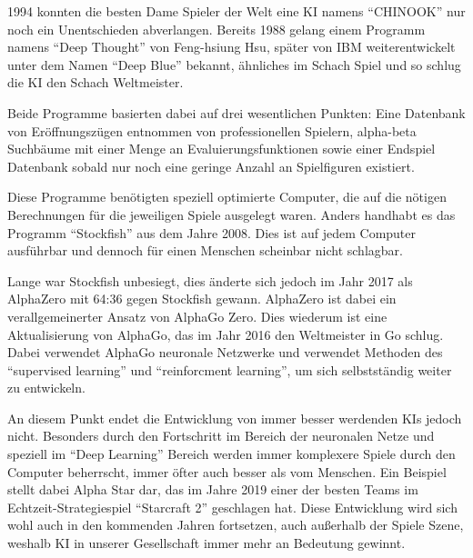 1994 konnten die besten Dame Spieler der Welt eine KI namens ``CHINOOK'' nur noch ein Unentschieden abverlangen. \cite{Schaeffer1996} Bereits 1988 gelang einem Programm namens ``Deep Thought'' von Feng-hsiung Hsu, später von IBM weiterentwickelt unter dem Namen ``Deep Blue'' bekannt, ähnliches im Schach Spiel und so schlug die KI den Schach Weltmeister. \cite{Kurenkov2019}

Beide Programme basierten dabei auf drei wesentlichen Punkten: Eine Datenbank von Eröffnungszügen entnommen von professionellen Spielern, alpha-beta Suchbäume mit einer Menge an Evaluierungsfunktionen sowie einer Endspiel Datenbank sobald nur noch eine geringe Anzahl an Spielfiguren existiert. \cite{Kurenkov2019}


Diese Programme benötigten speziell optimierte Computer, die auf die nötigen Berechnungen für die jeweiligen Spiele ausgelegt waren. Anders handhabt es das Programm ``Stockfish'' aus dem Jahre 2008. Dies ist auf jedem Computer ausführbar und dennoch für einen Menschen scheinbar nicht schlagbar.

Lange war Stockfish unbesiegt, dies änderte sich jedoch im Jahr 2017 als AlphaZero mit 64:36 gegen Stockfish gewann. AlphaZero ist dabei ein verallgemeinerter Ansatz von AlphaGo Zero. Dies wiederum ist eine Aktualisierung von AlphaGo, das im Jahr 2016 den Weltmeister in Go schlug. Dabei verwendet AlphaGo neuronale Netzwerke und verwendet Methoden des ``supervised learning'' und ``reinforcment learning'', um sich selbstständig weiter zu entwickeln. \cite{Fischer}


An diesem Punkt endet die Entwicklung von immer besser werdenden KIs jedoch nicht. Besonders durch den Fortschritt im Bereich der neuronalen Netze und speziell im ``Deep Learning'' Bereich werden immer komplexere Spiele durch den Computer beherrscht, immer öfter auch besser als vom Menschen. Ein Beispiel stellt dabei Alpha Star dar, das im Jahre 2019 einer der besten Teams im Echtzeit-Strategiespiel ``Starcraft 2'' geschlagen hat. Diese Entwicklung wird sich wohl auch in den kommenden Jahren fortsetzen, auch außerhalb der Spiele Szene, weshalb KI in unserer Gesellschaft immer mehr an Bedeutung gewinnt. \cite{OriolVinyalsIgorBabuschkinJunyoungChungMichaelMathieuMaxJaderbergWojtekCzarneckiAndrewDudzikAjaHuangPetkoGeorgievRichardPowellTimoEwaldsDanHorganManuelKroissIvoDanihelkaJohnAgapiouJunhyukOhValentinDalibard}

